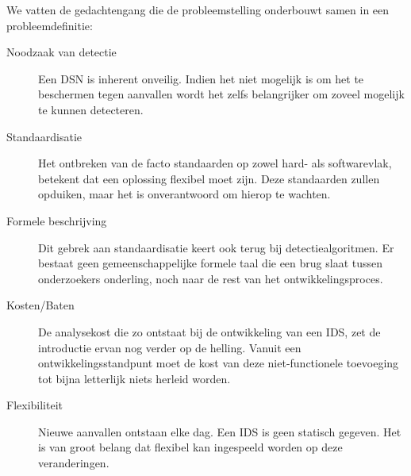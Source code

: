 We vatten de gedachtengang die de probleemstelling onderbouwt samen in een
probleemdefinitie:

\begin{description}

  \item[Noodzaak van detectie] Een DSN is inherent onveilig. Indien het niet
  mogelijk is om het te beschermen tegen aanvallen wordt het zelfs belangrijker
  om zoveel mogelijk te kunnen detecteren.

  \item[Standaardisatie] Het ontbreken van de facto standaarden op zowel hard-
  als softwarevlak, betekent dat een oplossing flexibel moet zijn. Deze
  standaarden zullen opduiken, maar het is onverantwoord om hierop te wachten.

  \item[Formele beschrijving] Dit gebrek aan standaardisatie keert ook terug
  bij detectiealgoritmen. Er bestaat geen gemeenschappelijke formele taal die
  een brug slaat tussen onderzoekers onderling, noch naar de rest van het
  ontwikkelingsproces.

  \item[Kosten/Baten] De analysekost die zo ontstaat bij de ontwikkeling van
  een IDS, zet de introductie ervan nog verder op de helling. Vanuit een
  ontwikkelingsstandpunt moet de kost van deze niet-functionele toevoeging tot
  bijna letterlijk niets herleid worden.

  \item[Flexibiliteit] Nieuwe aanvallen ontstaan elke dag. Een IDS is geen
  statisch gegeven. Het is van groot belang dat flexibel kan ingespeeld worden
  op deze veranderingen.

\end{description}
